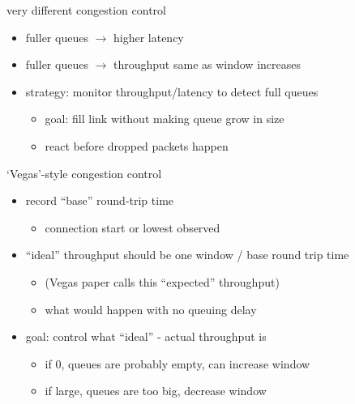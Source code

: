 \begin{frame}{very different congestion control}
    \begin{itemize}
    \item fuller queues $\rightarrow$ higher latency
    \item fuller queues $\rightarrow$ throughput same as window increases
    \vspace{.5cm}
    \item<2-> strategy: monitor throughput/latency to detect full queues
        \begin{itemize}
        \item goal: fill link without making queue grow in size
        \item react before dropped packets happen
        \end{itemize}
    \end{itemize}
\end{frame}

\begin{frame}{`Vegas'-style congestion control}
    \begin{itemize}
    \item record ``base'' round-trip time
        \begin{itemize}
        \item connection start or lowest observed
        \end{itemize}
    \item ``ideal'' throughput should be one window / base round trip time
        \begin{itemize}
        \item (Vegas paper calls this ``expected'' throughput)
        \item what would happen with no queuing delay
        \end{itemize}
    \vspace{.5cm}
    \item goal: control what ``ideal'' - actual throughput is
        \begin{itemize}
        \item if 0, queues are probably empty, can increase window
        \item if large, queues are too big, decrease window
        \end{itemize}
    \end{itemize}
\end{frame}

